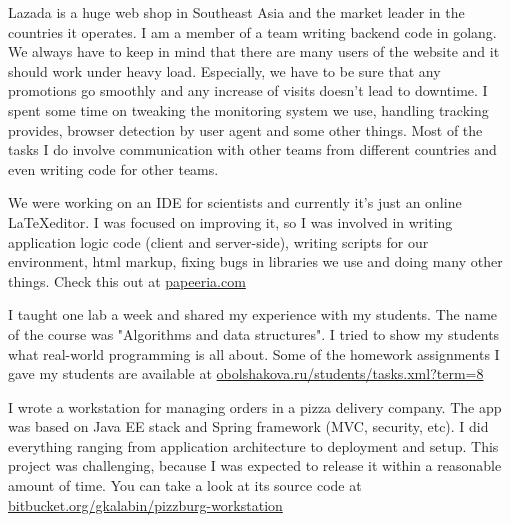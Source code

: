 \documentclass[11pt,a4paper]{moderncv-xetex}
\begin{document}
\maketitle

    {Lazada is a huge web shop in Southeast Asia and the market leader in the countries it operates. I am a member of a team writing backend code in golang. We always have to keep in mind that there are many users of the website and it should work under heavy load. Especially, we have to be sure that any promotions go smoothly and any increase of visits doesn't lead to downtime. I spent some time on tweaking the monitoring system we use, handling tracking provides, browser detection by user agent and some other things. Most of the tasks I do involve communication with other teams from different countries and even writing code for other teams.}
    
    {We were working on an IDE for scientists and currently it's just an online \LaTeX editor. I was focused on improving it, so I was involved in writing application logic code (client and server-side), writing scripts for our environment, html markup, fixing bugs in libraries we use and doing many other things. Check this out at \url{papeeria.com}}

    {I taught one lab a week and shared my experience with my students. The name of the course was "Algorithms and data structures". I tried to show my students what real-world programming is all about. Some of the homework assignments I gave my students are available at \url{obolshakova.ru/students/tasks.xml?term=8}}
    
    {I wrote a workstation for managing orders in a pizza delivery company. The app was based on Java EE stack and Spring framework (MVC, security, etc). I did everything ranging from application architecture to deployment and setup. This project was challenging, because I was expected to release it within a reasonable amount of time. You can take a look at its source code at \url{bitbucket.org/gkalabin/pizzburg-workstation}}
    
\end{document}
